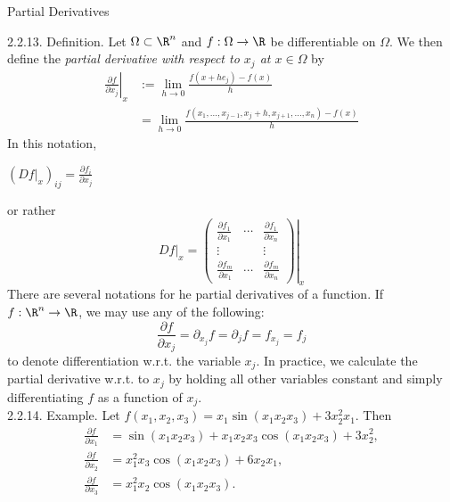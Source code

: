 \documentclass[smaller,hyperref={CJKbookmarks=true}]{beamer}
\begin{document}
\begin{frame}{Partial Derivatives}
\begin{spacing}{0.9}
\alert{2.2.13. Definition.} Let $\Omega\subset\R^n$ and $f:\Omega\to\R$ be dif{}ferentiable on $\Omega$.
We then define the \emph{partial derivative with
respect to $x_j$ at $x\in\Omega$} by
\begin{equation*}
  \begin{split}
     \left.\frac{\partial f}{\partial x_j}\right|_x &:=\lim_{h\to0}\frac{f(x+he_j)-f(x)}{h} \\
       &=\lim_{h\to0}\frac{f(x_1,\ldots,x_{j-1},x_j+h,x_{j+1},\ldots,x_n)-f(x)}{h}
  \end{split}
\end{equation*}
In this notation,
\begin{center}
  $\displaystyle(Df|_x)_{ij}=\frac{\partial f_i}{\partial x_j}$
\end{center}
or rather
\[Df|_x=\left.\begin{pmatrix}
          \frac{\partial f_1}{\partial x_1} & \cdots & \frac{\partial f_1}{\partial x_n} \\
          \vdots &  & \vdots \\
          \frac{\partial f_m}{\partial x_1} & \cdots & \frac{\partial f_m}{\partial x_n}
        \end{pmatrix}\right|_x\]
\newpage
There are several notations for he partial derivatives of a function. If $f:\R^n\to\R$, we may use any of the following:
\[\frac{\partial f}{\partial x_j}=\partial_{x_j}f=\partial_jf=f_{x_j}=f_j\]
to denote dif{}ferentiation w.r.t. the variable $x_j$. In practice, we calculate the partial derivative w.r.t. to $x_j$ by holding all other variables constant and simply dif{}ferentiating $f$ as a function of $x_j$.\\
\alert{2.2.14. Example.} Let $f(x_1,x_2,x_3)=x_1\sin(x_1x_2x_3)+3x_2^2x_1$. Then
\begin{align*}
  \frac{\partial f}{\partial x_1}&=\sin(x_1x_2x_3)+x_1x_2x_3\cos(x_1x_2x_3)+3x_2^2,\\
  \frac{\partial f}{\partial x_2}&=x_1^2x_3\cos(x_1x_2x_3)+6x_2x_1,\\
  \frac{\partial f}{\partial x_3}&=x_1^2x_2\cos(x_1x_2x_3).
\end{align*}
\end{spacing}
\end{frame}
\end{document}
